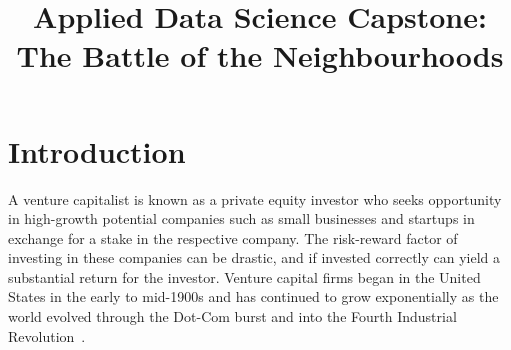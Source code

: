 \documentclass[12pt, conference]{IEEEtran}
\begin{document}
\onecolumn


%
%
\title{Applied Data Science Capstone:\\
The Battle of the Neighbourhoods}



\author{}
\maketitle



\section{\textbf{Introduction}}
\label{sec: Introduction}
A venture capitalist is known as a private equity investor who seeks opportunity in high-growth potential companies such as small businesses and startups in exchange for a stake in the respective company. The risk-reward factor of investing in these companies can be drastic, and if invested correctly can yield a substantial return for the investor. Venture capital firms began in the United States in the early to mid-1900s and has continued to grow exponentially as the world evolved through the Dot-Com burst and into the Fourth Industrial Revolution~\cite{VC}.\\
\end{document}
